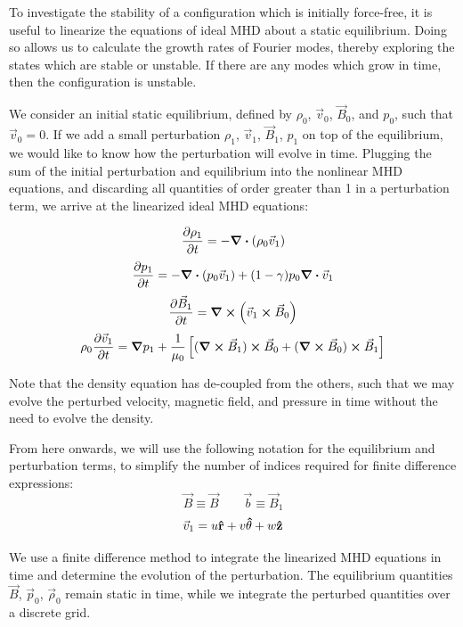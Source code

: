 \documentclass[%
 reprint,
 amsmath,amssymb,
 aps,
]{revtex4-2}
\begin{document}
To investigate the stability of a configuration which is initially force-free, it is useful to linearize the equations of ideal MHD about a static equilibrium. Doing so allows us to calculate the growth rates of Fourier modes, thereby exploring the states which are stable or unstable. If there are any modes which grow in time, then the configuration is unstable.

We consider an initial static equilibrium, defined by $\rho_0$, $\vec v_0$, $\vec B_0$, and $p_0$, such that $\vec v_0 = 0$. If we add a small perturbation $\rho_1$, $\vec v_1$, $\vec B_1$, $p_1$ on top of the equilibrium, we would like to know how the perturbation will evolve in time. Plugging the sum of the initial perturbation and equilibrium into the nonlinear MHD equations, and discarding all quantities of order greater than 1 in a perturbation term, we arrive at the linearized ideal MHD equations:

\begin{equation}
\pdv{\rho_1}{t} = - \div ( \rho_0 \vec v_1)    
\end{equation}
\begin{equation}
\pdv{p_1}{t} = - \div (p_0 \vec v _1) + (1 - \gamma) p_0 \div \vec v_1 
\end{equation}
\begin{equation}
\pdv{\vec B_1}{t} = \curl ( \vec v_1 \cross \vec B_0)
\end{equation}
\begin{equation}
\rho_0 \pdv{\vec v_1}{t} = \grad p_1 + \frac{1}{\mu_0} \left[ (\curl \vec B_1) \cross \vec B_0 + (\curl \vec B_0) \cross \vec B_1 \right]
\end{equation}

Note that the density equation has de-coupled from the others, such that we may evolve the perturbed velocity, magnetic field, and pressure in time without the need to evolve the density.

From here onwards, we will use the following notation for the equilibrium and perturbation terms, to simplify the number of indices required for finite difference expressions:
\begin{equation}
\vec B \equiv \vec B \qquad  \vec b \equiv \vec B_1
\end{equation}
\begin{equation}
\vec v_1 = u \vu r + v \vu \theta + w \vu z
\end{equation}

We use a finite difference method to integrate the linearized MHD equations in time and determine the evolution of the perturbation. The equilibrium quantities $\vec B$, $\vec p_0$, $\vec \rho_0$ remain static in time, while we integrate the perturbed quantities over a discrete grid.
\end{document}
